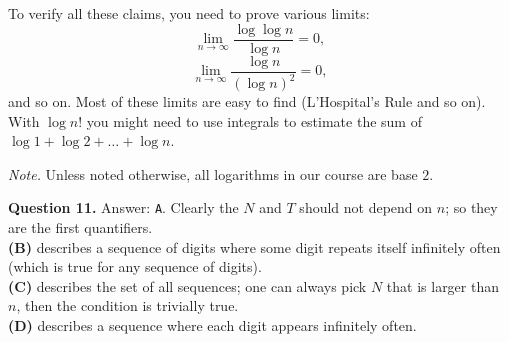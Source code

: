 \documentclass[jou]{apa6}
\begin{document}
To verify all these claims, you need to prove various limits: 
$$\lim_{n \rightarrow \infty} \frac{\log\log n}{\log n} = 0,$$
$$\lim_{n \rightarrow \infty} \frac{\log n}{(\log n)^2} = 0,$$
and so on. Most of these limits are easy to find (L'Hospital's Rule and so on). 
With $\log n!$ you might need to use integrals to estimate 
the sum of $\log 1 + \log 2 + \ldots + \log n$. 

{\em Note.} Unless noted otherwise, all logarithms in our course are base $2$. 



\vspace{6pt}
{\bf Question 11.} Answer: {\tt A}. 
Clearly the $N$ and $T$ should not depend on $n$; so they are the first quantifiers.\\
{\bf (B)} describes a sequence of digits where some digit repeats itself infinitely 
often (which is true for any sequence of digits).\\
{\bf (C)} describes the set of all sequences; one can always pick $N$ that is larger than $n$, 
then the condition is trivially true.\\ 
{\bf (D)} describes a sequence where each digit appears infinitely often. 
\end{document}
